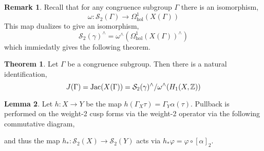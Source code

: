 \documentclass{article}
\newcommand{\Z}{\mathbb{Z}}
\theoremstyle{definition}
\newtheorem{theorem}{Theorem}[section]
\newtheorem{lemma}[theorem]{Lemma}
\newtheorem{remark}{Remark}[section]
\renewcommand{\S}[1]{\mathcal{S}_{#1}}
\begin{document}
\begin{remark}
Recall that for any congruence subgroup $\Gamma$ there is an isomorphism,
\[ \omega : \S{2}(\Gamma) \to \Omega^1_{\text{hol}}(X(\Gamma)) \]
This map dualizes to give an isomorphism,
\[ \S{2}(\gamma)^\wedge = \omega^\wedge(\Omega^1_{\text{hol}}(X(\Gamma))^\wedge) \]
which immiedatly gives the following theorem.
\end{remark}

\begin{theorem}
Let $\Gamma$ be a congruence subgroup. Then there is a natural identification,
\[ J(\Gamma) = \Jac{X(\Gamma)} = \S{2}(\gamma)^\wedge / \omega^\wedge(H_1(X, \Z)) \]
\end{theorem}

\begin{lemma}
Let $h : X \to Y$ be the map $h(\Gamma_X  \tau) = \Gamma_Y \alpha(\tau)$. 
Pullback is performed on the weight-2 cusp forms via the weight-2 operator via the following commutative diagram,
\begin{center}
\end{center}
and thus the map $h_* : \S{2}(X) \to \S{2}(Y)$ acts via $h_* \varphi = \varphi \circ [\alpha]_2$. 
\end{lemma}
\end{document}
